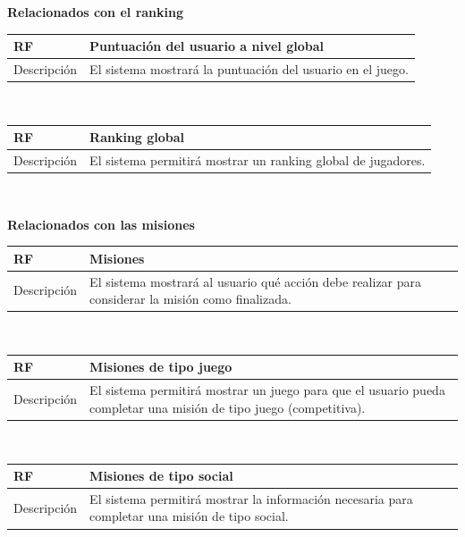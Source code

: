 \documentclass[twoside]{report}
\newcommand\addrow[2]{#1 &#2\\ }
\newcommand\addheading[2]{#1 &#2\\ \hline}
\newcommand\tabularhead{\begin{tabular}{lp{0.7\textwidth}}
\hline
}
\newenvironment{req}{\tabularhead}
{\hline\end{tabular}}
\begin{document}
\vspace{1cm}

\textbf{Relacionados con el ranking}\\

\begin{req}
	\addheading{\textbf{RF\arabic{functionalRequirements}}}{Puntuación del usuario a nivel global}
	\addrow{Descripción}{El sistema mostrará la puntuación del usuario en el juego.}
\end{req}\\

\vspace{0.25cm}

\begin{req}
	\addheading{\textbf{RF\arabic{functionalRequirements}}}{Ranking global}
	\addrow{Descripción}{El sistema permitirá mostrar un ranking global de jugadores.}
\end{req}\\

\vspace{1cm}

\textbf{Relacionados con las misiones}\\

\begin{req}
	\addheading{\textbf{RF\arabic{functionalRequirements}}}{Misiones}
	\addrow{Descripción}{El sistema mostrará al usuario qué acción debe realizar para considerar la misión como finalizada.}
\end{req}\\

\vspace{0.25cm}

\begin{req}
	\addheading{\textbf{RF\arabic{functionalRequirements}}}{Misiones de tipo juego}
	\addrow{Descripción}{El sistema permitirá mostrar un juego para que el usuario pueda completar una misión de tipo juego (competitiva).}
\end{req}\\

\vspace{0.25cm}

\begin{req}
	\addheading{\textbf{RF\arabic{functionalRequirements}}}{Misiones de tipo social}
	\addrow{Descripción}{El sistema permitirá mostrar la información necesaria para completar una misión de tipo social.}
\end{req}\\
\end{document}
